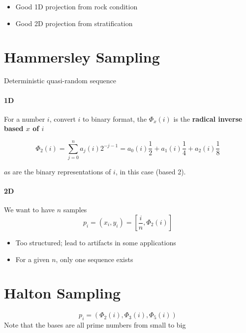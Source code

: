   \begin{itemize}
    \item Good 1D projection from rock condition
    \item Good 2D projection from stratification
  \end{itemize}

\section{Hammersley Sampling}

  Deterministic quasi-random sequence

  \paragraph{1D} For a number $ i $, convert $ i $ to binary format, the
  $ \Phi_{x} \left( i \right) $ is the \textbf{radical inverse based $ x $ of $ i $}

  \begin{equation}
    \Phi_{2}\left( i \right)
      = \sum_{j = 0}^{n} a_{j} \left( i \right) 2^{-j - 1}
      = a_{0} \left( i \right) \frac{1}{2}
      + a_{1} \left( i \right) \frac{1}{4}
      + a_{2} \left( i \right) \frac{1}{8}
  \end{equation}

  $ a $s are the binary representations of $ i $, in this case (based 2).

  \paragraph{2D} We want to have $ n $ samples
  \begin{equation}
    p_{i}
      = \left( x_{i}, y_{i} \right)
      = \left[ \frac{i}{n}, \Phi_{2}\left( i \right) \right]
  \end{equation}

  \begin{itemize}
    \item Too structured; lead to artifacts in some applications
    \item For a given $ n $, only one sequence exists
  \end{itemize}

\section{Halton Sampling}

  \begin{equation}
    p_{i} =
    \left(
      \Phi_{2} \left( i \right),
      \Phi_{3} \left( i \right),
      \Phi_{5} \left( i \right)
    \right)
  \end{equation}
  Note that the bases are all prime numbers from small to big

